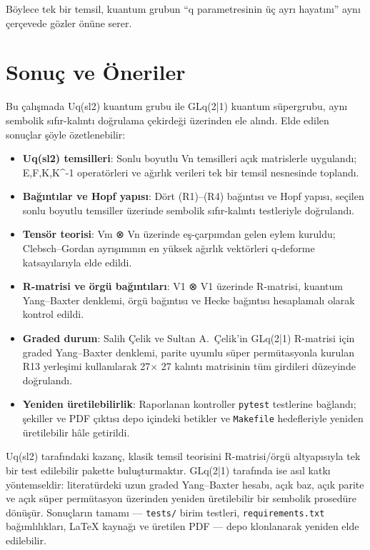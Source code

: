 \documentclass[12pt,a4paper]{report}
\numberwithin{equation}{chapter}
\theoremstyle{plain}
\theoremstyle{definition}
\begin{document}
Böylece tek bir temsil, kuantum grubun ``q parametresinin üç ayrı hayatını''
aynı çerçevede gözler önüne serer.

\chapter{Sonuç ve Öneriler}

Bu çalışmada Uq(sl2) kuantum grubu ile GLq(2|1) kuantum süpergrubu, aynı
sembolik sıfır-kalıntı doğrulama çekirdeği üzerinden ele alındı. Elde edilen
sonuçlar şöyle özetlenebilir:

\begin{itemize}[leftmargin=*]
  \item \textbf{Uq(sl2) temsilleri}: Sonlu boyutlu Vn temsilleri açık
        matrislerle uygulandı; E,F,K,K^-1 operatörleri ve ağırlık verileri
        tek bir temsil nesnesinde toplandı.
  \item \textbf{Bağıntılar ve Hopf yapısı}: Dört (R1)--(R4) bağıntısı ve Hopf
        yapısı, seçilen sonlu boyutlu temsiller üzerinde sembolik
        sıfır-kalıntı testleriyle doğrulandı.
  \item \textbf{Tensör teorisi}: Vm ⊗ Vn üzerinde eş-çarpımdan gelen
        eylem kuruldu; Clebsch--Gordan ayrışımının en yüksek ağırlık vektörleri
        q-deforme katsayılarıyla elde edildi.
  \item \textbf{R-matrisi ve örgü bağıntıları}: V1 ⊗ V1 üzerinde
        R-matrisi, kuantum Yang--Baxter denklemi, örgü bağıntısı ve Hecke
        bağıntısı hesaplamalı olarak kontrol edildi.
  \item \textbf{Graded durum}: Salih Çelik ve Sultan A.\ Çelik'in
        GLq(2|1) R-matrisi için graded Yang--Baxter denklemi, parite
        uyumlu süper permütasyonla kurulan R13 yerleşimi kullanılarak
        27× 27 kalıntı matrisinin tüm girdileri düzeyinde doğrulandı.
  \item \textbf{Yeniden üretilebilirlik}: Raporlanan kontroller
        \texttt{pytest} testlerine bağlandı; şekiller ve PDF çıktısı depo
        içindeki betikler ve \texttt{Makefile} hedefleriyle yeniden üretilebilir
        hâle getirildi.
\end{itemize}

Uq(sl2) tarafındaki kazanç, klasik temsil teorisini R-matrisi/örgü altyapısıyla
tek bir test edilebilir pakette buluşturmaktır. GLq(2|1) tarafında ise asıl
katkı yöntemseldir: literatürdeki uzun graded Yang--Baxter hesabı, açık baz,
açık parite ve açık süper permütasyon üzerinden yeniden üretilebilir bir sembolik
prosedüre dönüşür. Sonuçların tamamı --- \texttt{tests/} birim testleri,
\texttt{requirements.txt} bağımlılıkları, LaTeX kaynağı ve üretilen PDF --- depo
klonlanarak yeniden elde edilebilir.
\end{document}
